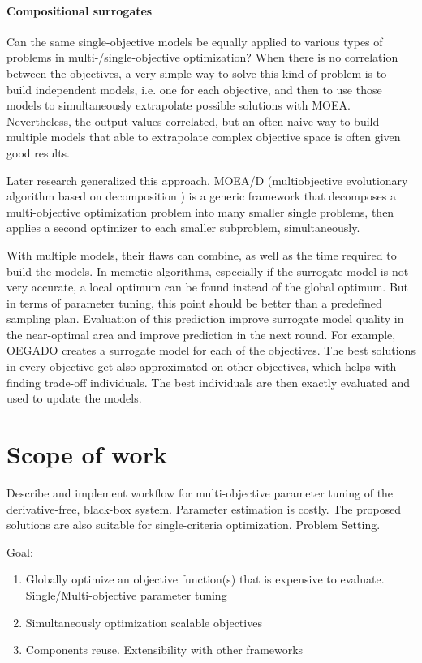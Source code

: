        \paragraph{Compositional surrogates}
        Can the same single-objective models be equally applied to various types of problems in multi-/single-objective optimization?
        When there is no correlation between the objectives, a very simple way to solve this kind of problem is to build independent models, i.e. one for each objective, and then to use those models to simultaneously extrapolate possible solutions with MOEA. Nevertheless, the output values correlated, but an often naive way to build multiple models that able to extrapolate complex objective space is often given good results.  

        Later research generalized this approach. MOEA/D (multiobjective evolutionary algorithm based on decomposition \cite{ZhangL07}) is a generic framework that decomposes a multi-objective optimization problem into many smaller single problems, then applies a second optimizer to each smaller subproblem, simultaneously.

        With multiple models, their flaws can combine, as well as the time required to build the models. In memetic algorithms, especially if the surrogate model is not very accurate, a local optimum can be found instead of the global optimum. But in terms of parameter tuning, this point should be better than a predefined sampling plan. Evaluation of this prediction improve surrogate model quality in the near-optimal area and improve prediction in the next round.
        For example, OEGADO \cite{ChafekarSRX05} creates a surrogate model for each of the objectives. The best solutions in every objective get also approximated on other objectives, which helps with finding trade-off individuals. The best individuals are then exactly evaluated and used to update the models.

    \section{Scope of work}

        Describe and implement workflow for multi-objective parameter tuning of the derivative-free, black-box system. Parameter estimation is costly. The proposed solutions are also suitable for single-criteria optimization. Problem Setting.

        Goal:
        \begin{enumerate}
            \item Globally optimize an objective function(s) that is expensive to evaluate. Single/Multi-objective parameter tuning
            \item Simultaneously optimization scalable objectives
            \item Components reuse. Extensibility with other frameworks
        \end{enumerate}

